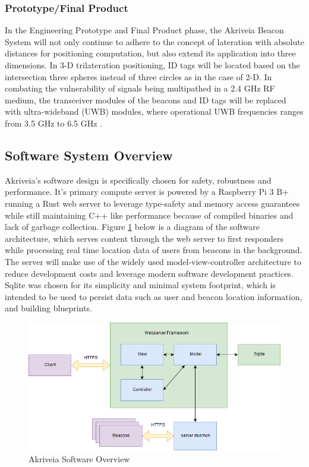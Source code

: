 \subsubsection{Prototype/Final Product}
In the Engineering Prototype and Final Product phase, the Akriveia Beacon System will not only continue to adhere to the concept of lateration with absolute distances for positioning computation, but also extend its application into three dimensions. In 3-D trilateration positioning, ID tags will be located based on the intersection three spheres instead of three circles as in the case of 2-D. In combating the vulnerability of signals being multipathed in a 2.4 GHz RF medium, the transceiver modules of the beacons and ID tags will be replaced with ultra-wideband (UWB) modules, where operational UWB frequencies ranges from 3.5 GHz to 6.5 GHz \cite{R4}.
\break



\subsection{Software System Overview}
Akriveia's software design is specifically chosen for safety, robustness and performance. It's primary compute server is powered by a Raspberry Pi 3 B+ running a Rust web server to leverage type-safety and memory access guarantees while still maintaining C++ like performance because of compiled binaries and lack of garbage collection. Figure \ref{software_diagram} below is a diagram of the software architecture, which serves content through the web server to first responders while processing real time location data of users from beacons in the background. The server will make use of the widely used model-view-controller architecture to reduce development costs and leverage modern software development practices. Sqlite was chosen for its simplicity and minimal system footprint, which is intended to be used to persist data such as user and beacon location information, and building blueprints.

\bigskip
\begin{figure}[h!]
    \centering
    \includegraphics[width=\linewidth]{./images/softwarediagram.png}
    \caption{Akriveia Software Overview}
    \label{software_diagram}
\end{figure}
\bigskip


